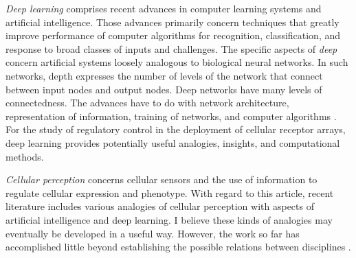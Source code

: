 \documentclass[\mydocfontsize]{article}
\begin{document}
\begin{multicols}{2}
\textit{Deep learning} comprises recent advances in computer learning systems and artificial intelligence. Those advances primarily concern techniques that greatly improve performance of computer algorithms for recognition, classification, and response to broad classes of inputs and challenges. The specific aspects of \textit{deep} concern artificial systems loosely analogous to biological neural networks. In such networks, depth expresses the number of levels of the network that connect between input nodes and output nodes. Deep networks have many levels of connectedness. The advances have to do with network architecture, representation of information, training of networks, and computer algorithms \autocite{nielsen15neural,goodfellow16deep}. For the study of regulatory control in the deployment of cellular receptor arrays, deep learning provides potentially useful analogies, insights, and computational methods.

\textit{Cellular perception} concerns cellular sensors and the use of information to regulate cellular expression and phenotype. With regard to this article, recent literature includes various analogies of cellular perception with aspects of artificial intelligence and deep learning. I believe these kinds of analogies may eventually be developed in a useful way. However, the work so far has accomplished little beyond establishing the possible relations between disciplines \autocite{lyon15the-cognitive,baluska16on-having,mitchell16cellular}.

\ifmulticol\end{multicols}\fi
\end{document}
